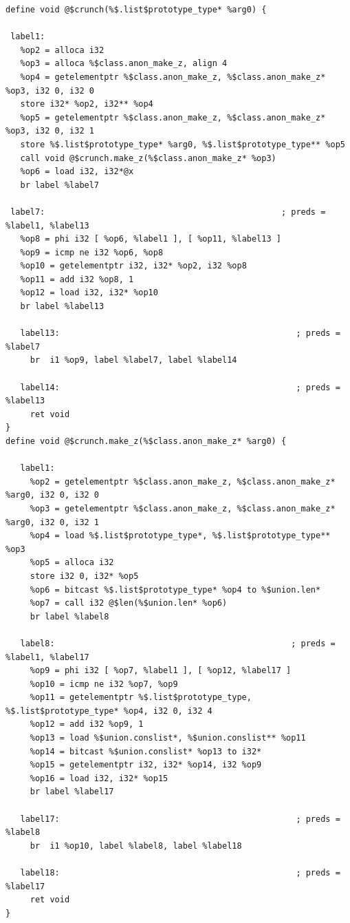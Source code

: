 \documentclass[a4paper]{exam}
\theoremstyle{definition}
\begin{document}
\begin{verbatim}
define void @$crunch(%$.list$prototype_type* %arg0) {
 
 label1:
   %op2 = alloca i32
   %op3 = alloca %$class.anon_make_z, align 4
   %op4 = getelementptr %$class.anon_make_z, %$class.anon_make_z* %op3, i32 0, i32 0
   store i32* %op2, i32** %op4
   %op5 = getelementptr %$class.anon_make_z, %$class.anon_make_z* %op3, i32 0, i32 1
   store %$.list$prototype_type* %arg0, %$.list$prototype_type** %op5
   call void @$crunch.make_z(%$class.anon_make_z* %op3)
   %op6 = load i32, i32*@x
   br label %label7
   
 label7:                                                ; preds = %label1, %label13
   %op8 = phi i32 [ %op6, %label1 ], [ %op11, %label13 ]
   %op9 = icmp ne i32 %op6, %op8
   %op10 = getelementptr i32, i32* %op2, i32 %op8
   %op11 = add i32 %op8, 1
   %op12 = load i32, i32* %op10
   br label %label13
   
   label13:                                                ; preds = %label7
     br  i1 %op9, label %label7, label %label14
     
   label14:                                                ; preds = %label13
     ret void
}
define void @$crunch.make_z(%$class.anon_make_z* %arg0) {
     
   label1:
     %op2 = getelementptr %$class.anon_make_z, %$class.anon_make_z* %arg0, i32 0, i32 0
     %op3 = getelementptr %$class.anon_make_z, %$class.anon_make_z* %arg0, i32 0, i32 1
     %op4 = load %$.list$prototype_type*, %$.list$prototype_type** %op3
     %op5 = alloca i32
     store i32 0, i32* %op5
     %op6 = bitcast %$.list$prototype_type* %op4 to %$union.len*
     %op7 = call i32 @$len(%$union.len* %op6)
     br label %label8
     
   label8:                                                ; preds = %label1, %label17
     %op9 = phi i32 [ %op7, %label1 ], [ %op12, %label17 ]
     %op10 = icmp ne i32 %op7, %op9
     %op11 = getelementptr %$.list$prototype_type, %$.list$prototype_type* %op4, i32 0, i32 4
     %op12 = add i32 %op9, 1
     %op13 = load %$union.conslist*, %$union.conslist** %op11
     %op14 = bitcast %$union.conslist* %op13 to i32*
     %op15 = getelementptr i32, i32* %op14, i32 %op9
     %op16 = load i32, i32* %op15
     br label %label17
     
   label17:                                                ; preds = %label8
     br  i1 %op10, label %label8, label %label18
     
   label18:                                                ; preds = %label17
     ret void
}
\end{verbatim}
\end{document}
